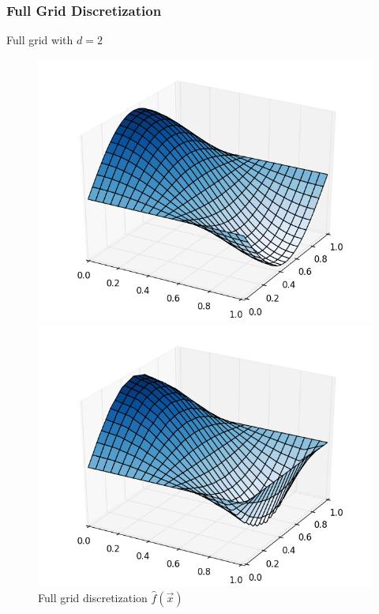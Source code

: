 \begin{frame}
  \frametitle{Full Grid Discretization}
  \topline
  \vspace{-10px}
  \begin{block}{Full grid with $d = 2$}

    \begin{figure}[!htb]
      \includegraphics[width=\linewidth]{images/2dgrid_1_2.png}
      \vspace{-12px}
      \caption{$f(x) = \text{sin}(x_1) \cdot \text{cos}(x_2)$}
      \endminipage
      \includegraphics[width=\linewidth]{images/2dgrid_2_2.png}
      \vspace{-12px}
      \caption{Full grid discretization $\hat{f}(\vec{x})$}
      \endminipage
    \end{figure}
  \end{block}
\end{frame}

